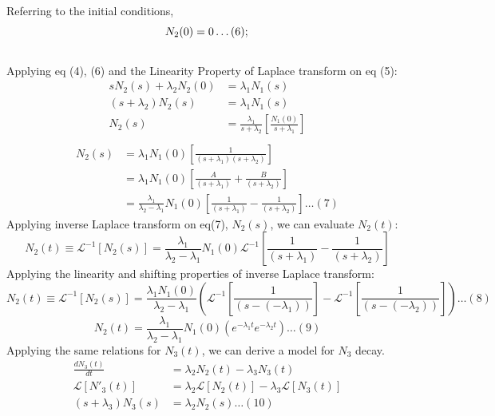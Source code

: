 \documentclass[12pt]{article}
\theoremstyle{plain}
\theoremstyle{definition}
\begin{document}
Referring to the initial conditions,
\begin{equation*}
N_2(0) = 0\dots(6);\\
\end{equation*}
\\
Applying eq (4), (6) and the Linearity Property of Laplace transform on eq (5):
\begin{align*}
sN_2(s) + \lambda_2 N_2(0) &= \lambda_1N_1(s)\\
(s + \lambda_2)N_2(s) &= \lambda_1N_1(s)\\
N_2(s) &= \frac{ \lambda_1}{s+\lambda_2} \left[\frac{N_1(0)}{s+\lambda_1}\right]\\
\end{align*}
\begin{align*}
N_2(s) &= \lambda_1 N_1(0)\left[\frac{1 }{(s+\lambda_1)(s+\lambda_2)}\right]\\
&= \lambda_1 N_1(0)\left[\frac{A}{(s+\lambda_1)}+\frac{B}{(s+\lambda_2)}\right]\\
&= \frac{\lambda_1}{\lambda_2 - \lambda_1}N_1(0)\left[\frac{1}{(s+\lambda_1)}-\frac{1}{(s+\lambda_2)}\right] \dots (7)
\end{align*}
Applying inverse Laplace transform on eq(7), $N_2(s)$, we can evaluate $N_2(t)$:
\begin{equation*}
N_2(t) \equiv \mathcal{L}^{-1}[N_2(s)] = \frac{\lambda_1}{\lambda_2 - \lambda_1}N_1(0)\mathcal{L}^{-1}\left[\frac{1}{(s+\lambda_1)}-\frac{1}{(s+\lambda_2)}\right]
\end{equation*}
Applying the linearity and shifting properties of inverse Laplace transform:
\begin{equation*}
N_2(t) \equiv \mathcal{L}^{-1}[N_2(s)] = \frac{\lambda_1 N_1(0)}{\lambda_2 - \lambda_1} \left(\mathcal{L}^{-1}\left[\frac{1}{(s-(-\lambda_1))}\right] -\mathcal{L}^{-1}\left[\frac{1}{(s-(-\lambda_2))}\right]\right) \dots (8)
\end{equation*}
\begin{equation*}
N_2(t)=\frac{\lambda_1}{\lambda_2 - \lambda_1}N_1(0)\left(e^{-\lambda_1t} e^{-\lambda_2t}\right)\dots(9)
\end{equation*}
Applying the same relations for $N_3(t)$, we can derive a model for $N_3$ decay. 
\begin{align*}
\frac{dN_3(t)}{dt} &= \lambda_{2}N_2(t) - \lambda_3 N_3(t)\\
\mathcal{L}[N'_3(t)] &= \lambda_{2} \mathcal{L}[N_2(t)] - \lambda_3 \mathcal{L}[N_3(t)]\\
(s+\lambda_3)N_3(s) &=\lambda_2 N_2(s) \dots (10)
\end{align*}
\end{document}
